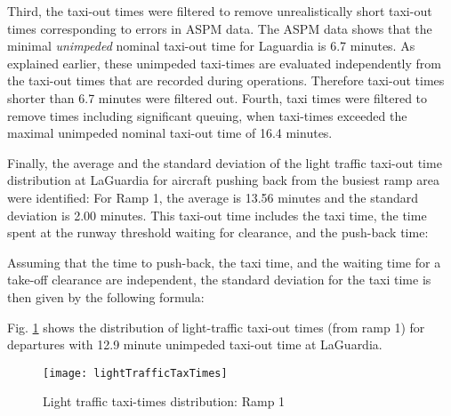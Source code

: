 \documentclass[letterpaper]{article}
\begin{document}
\indent Third, the taxi-out times were filtered to remove unrealistically short taxi-out times corresponding to errors in ASPM data.
 The ASPM data shows that the minimal \emph{unimpeded} nominal taxi-out time for Laguardia is 6.7 minutes. As explained earlier, 
 these unimpeded taxi-times are evaluated independently from the taxi-out times that are recorded during operations. Therefore taxi-out times shorter than 6.7 minutes
  were filtered out.
 \indent Fourth, taxi times were filtered to remove times including significant queuing, when taxi-times exceeded the maximal unimpeded nominal
  taxi-out time of 16.4 minutes.



\indent Finally, the average and the standard deviation of the light traffic taxi-out time distribution at LaGuardia for aircraft pushing back from the busiest ramp area were identified: For Ramp 1, the average is 13.56 minutes and the standard deviation is 2.00 minutes. This taxi-out time includes the taxi time, the time spent at the runway threshold waiting for clearance, and the push-back time:


Assuming that the time to push-back, the taxi time, and the waiting time for a take-off clearance are independent, the standard deviation for the taxi time is then given by the following formula:



Fig. \ref{lightTrafficTaxTimesSelection} shows the distribution of light-traffic taxi-out times (from ramp 1) for departures with 12.9 minute unimpeded taxi-out time at LaGuardia.

\begin{figure}[ht]
\centering
\texttt{[image: lightTrafficTaxTimes]}
\caption{Light traffic taxi-times distribution: Ramp 1}
\label{lightTrafficTaxTimesSelection}
\end{figure}
\end{document}
